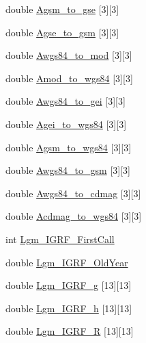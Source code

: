 \begin{CompactItemize}
\item 
double \hyperlink{struct_lgm___c_trans_37da7699c286f0a4542396aaab17bb36}{Agsm\_\-to\_\-gse} \mbox{[}3\mbox{]}\mbox{[}3\mbox{]}
\item 
double \hyperlink{struct_lgm___c_trans_568504cf16f5e31c68e955235b19f883}{Agse\_\-to\_\-gsm} \mbox{[}3\mbox{]}\mbox{[}3\mbox{]}
\item 
double \hyperlink{struct_lgm___c_trans_3bde4bf5f61bc97b0c2984ea06677989}{Awgs84\_\-to\_\-mod} \mbox{[}3\mbox{]}\mbox{[}3\mbox{]}
\item 
double \hyperlink{struct_lgm___c_trans_7fb70629ed011b03df0429787e1b9ad4}{Amod\_\-to\_\-wgs84} \mbox{[}3\mbox{]}\mbox{[}3\mbox{]}
\item 
double \hyperlink{struct_lgm___c_trans_13ae99230c1a3caec0d3b78ad714de4b}{Awgs84\_\-to\_\-gei} \mbox{[}3\mbox{]}\mbox{[}3\mbox{]}
\item 
double \hyperlink{struct_lgm___c_trans_e70d75fd4a8b4ef9a3271f875183b402}{Agei\_\-to\_\-wgs84} \mbox{[}3\mbox{]}\mbox{[}3\mbox{]}
\item 
double \hyperlink{struct_lgm___c_trans_6322719ffe580e8f5b206972478e1c41}{Agsm\_\-to\_\-wgs84} \mbox{[}3\mbox{]}\mbox{[}3\mbox{]}
\item 
double \hyperlink{struct_lgm___c_trans_88eb2b4dca5ab35213cadf57cf09de4c}{Awgs84\_\-to\_\-gsm} \mbox{[}3\mbox{]}\mbox{[}3\mbox{]}
\item 
double \hyperlink{struct_lgm___c_trans_3c3703af84212fe400ea4de85746f86c}{Awgs84\_\-to\_\-cdmag} \mbox{[}3\mbox{]}\mbox{[}3\mbox{]}
\item 
double \hyperlink{struct_lgm___c_trans_1f66bf8da027bcc6ac0535710e14027f}{Acdmag\_\-to\_\-wgs84} \mbox{[}3\mbox{]}\mbox{[}3\mbox{]}
\item 
int \hyperlink{struct_lgm___c_trans_4ed10c5333f6674ca1574d00c56ae3da}{Lgm\_\-IGRF\_\-FirstCall}
\item 
double \hyperlink{struct_lgm___c_trans_fecd660b4543de5ef4d7313ab481d28c}{Lgm\_\-IGRF\_\-OldYear}
\item 
double \hyperlink{struct_lgm___c_trans_2f34dac1bc690a7daee26931f3035a4b}{Lgm\_\-IGRF\_\-g} \mbox{[}13\mbox{]}\mbox{[}13\mbox{]}
\item 
double \hyperlink{struct_lgm___c_trans_fcef05c35f42f86c066479ae8ebef3a4}{Lgm\_\-IGRF\_\-h} \mbox{[}13\mbox{]}\mbox{[}13\mbox{]}
\item 
double \hyperlink{struct_lgm___c_trans_62099f52bc9f00a420106275ee55dacb}{Lgm\_\-IGRF\_\-R} \mbox{[}13\mbox{]}\mbox{[}13\mbox{]}
\item 

\end{CompactItemize}
